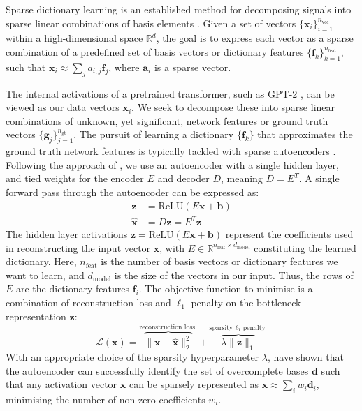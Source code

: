 \documentclass[11pt]{scrartcl}
\begin{document}
Sparse dictionary learning is an established method for decomposing signals into sparse linear combinations of basis elements \citep{olshausen1997sparse, lee2006efficient}. Given a set of vectors \(\{\mathbf{x}_i\}_{i=1}^{n_{\text{vec}}}\) within a high-dimensional space \(\mathbb{R}^d\), the goal is to express each vector as a sparse combination of a predefined set of basis vectors or dictionary features \(\{\mathbf{f}_k\}_{k=1}^{n_{\text{feat}}}\), such that \(\mathbf{x}_i \approx \sum_j a_{i, j} \mathbf{f}_j\), where \(\mathbf{a}_i\) is a sparse vector.

The internal activations of a pretrained transformer, such as GPT-2 \citep{radford2019language}, can be viewed as our data vectors \(\mathbf{x}_i\). We seek to decompose these into sparse linear combinations of unknown, yet significant, network features or ground truth vectors \(\{\mathbf{g}_j\}_{j=1}^{n_{\text{gt}}}\). The pursuit of learning a dictionary \(\{\mathbf{f}_k\}\) that approximates the ground truth network features is typically tackled with sparse autoencoders \citep{sharkey2022taking}. Following the approach of \citet{cunningham2023sparse}, we use an autoencoder with a single hidden layer, and tied weights for the encoder $E$ and decoder $D$, meaning $D=E^T$. A single forward pass through the autoencoder can be expressed as:
\begin{align*}
\mathbf{z} &= \text{ReLU}(E\mathbf{x}+\mathbf{b}) \\
\mathbf{\hat{x}} &= D\mathbf{z} = E^T \mathbf{z}
\end{align*}
The hidden layer activations \(\mathbf{z} = \text{ReLU}(E \mathbf{x} + \mathbf{b})\) represent the coefficients used in reconstructing the input vector \(\mathbf{x}\), with \(E \in \mathbb{R}^{n_\text{feat}\times d_\text{model}}\) constituting the learned dictionary. Here, $n_\text{feat}$ is the number of basis vectors or dictionary features we want to learn, and $d_\text{model}$ is the size of the vectors in our input. Thus, the rows of $E$ are the dictionary features $\mathbf{f}_i$. The objective function to minimise is a combination of reconstruction loss and $\ell_1$ penalty on the bottleneck representation $\mathbf{z}$:
$$
\mathcal{L}(\mathbf{x})=\overbrace{\|\mathbf{x}-\hat{\mathbf{x}}\|_2^2}^{\text {reconstruction loss }}+\overbrace{\lambda\|\mathbf{z}\|_1}^{\text {sparsity $\ell_1$ penalty }}
$$
With an appropriate choice of the sparsity hyperparameter $\lambda$, \citet{wright2022high} have shown that the autoencoder can successfully identify the set of overcomplete bases \(\mathbf{d}\) such that any activation vector \(\mathbf{x}\) can be sparsely represented as \(\mathbf{x} \approx \sum_i w_i \mathbf{d}_i\), minimising the number of non-zero coefficients \(w_i\).
\end{document}
